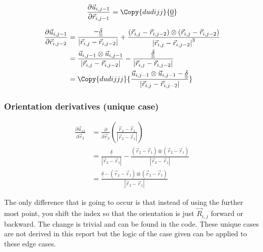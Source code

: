 \documentclass{article}
\renewcommand{\ij}{_{i,j}}
\newcommand{\ijj}{_{i,j-1}}
\newcommand{\ijk}{_{i,j-2}}
\newcommand{\ijjj}{_{i,j-2}}
\newcommand{\magn}[1]{\left\vert #1 \right\vert }
\renewcommand{\part}[2]{\frac{\partial #1 }{\partial #2}}
\newcommand{\partbig}[2]{\frac{\partial }{\partial #2}\left( #1 \right)}
\newcommand{\ten}[1]{\underline{\underline{#1}}}
\newcommand{\rij}{\vec{r} \ij}
\newcommand{\Rij}{\vec{R} \ij}
\newcommand{\rijjj}{\vec{r} \ijjj}
\newcommand{\rijk}{\vec{r} \ijk}
\newcommand{\uijj}{\vec{u} \ijj}
\begin{document}
\begin{align*}
  \part{\vec{u} \ijj }{\vec{r} \ijj} = 
  \Copy{dudijj}{ \ten{0}}
\end{align*}

\begin{align*}
  \part{\vec{u} \ijj }{\vec{r} \ijk} 
  &=
     \frac{-\ten{\delta }}{\magn{\vec{r} \ij - \vec{r} \ijjj}} 
  +
  \frac{
    \left(\rij - \rijk \right)\otimes 
  \left(\rij - \rijk \right)
  }{
    \magn{\rij - \rijjj } ^3
    }
  \\
  & =
  \frac{\uijj \otimes \uijj}{\magn{\rij - \rijjj}}
  -
  \frac{\ten{\delta}}{\magn{\rij - \rijjj}} 
  \\
  &  =
  \Copy{dudijjj}
  {
  \frac{\uijj \otimes \uijj - \ten{\delta} }{\magn{\rij - \rijjj}}
  }
\end{align*}


\subsubsection{Orientation derivatives (unique case)}

\begin{align*}
  \part{\vec{u}_{12}}{\vec{r}_{2}} 
  &=
  \partbig{\frac{\vec{r}_2 - \vec{r}_1}{\magn{\vec{r}_2 - \vec{r}_1}}}
  {\vec{r}_{2}}
  \\
  &=
  \frac{\ten{\delta}}
  {\magn{\vec{r}_{2} - \vec{r}_{1}}} 
  - 
  \frac{(\vec{r}_{2} - \vec{r}_{1} ) 
  \otimes 
  (\vec{r}_{2} - \vec{r}_{1} )
  }
  {\magn{\vec{r}_{2} - \vec{r}_{1}}} \\
  & = 
  \frac{
  \ten{\delta}  
  -
  (\vec{r}_{2} - \vec{r}_{1} ) 
  \otimes 
  (\vec{r}_{2} - \vec{r}_{1} )
  }
  {\magn{\vec{r}_{2} - \vec{r}_{1}}} 
\end{align*}


The only difference that is going to occur is that instead of using the further
most point, you shift the index so that the orientation is just $\Rij$ forward
or backward. The change is trivial and can be found in the code. These unique
cases are not derived in this report but the logic of the case given can be
applied to these edge cases.
\end{document}
